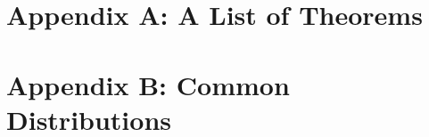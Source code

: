 \documentclass[letterpaper, 10pt]{article}
\begin{document}
\section{Appendix A: A List of Theorems}
{\footnotesize

}

\section{Appendix B: Common Distributions}
{\footnotesize

}
\end{document}
